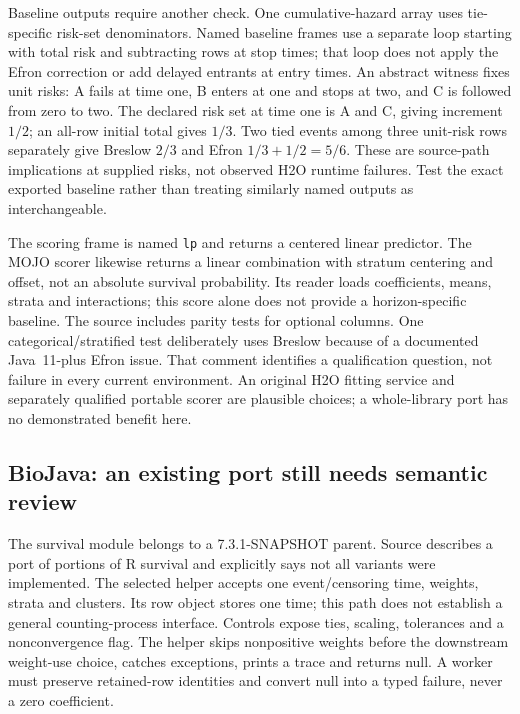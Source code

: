 Baseline outputs require another check. One cumulative-hazard array uses
tie-specific risk-set denominators. Named baseline frames use a separate loop
starting with total risk and subtracting rows at stop times; that loop does
not apply the Efron correction or add delayed entrants at entry times.
An abstract witness fixes unit risks: A fails at time one, B enters at one
and stops at two, and C is followed from zero to two. The declared risk set
at time one is A and C, giving increment $1/2$; an all-row initial total gives
$1/3$. Two tied events among three unit-risk rows separately give Breslow
$2/3$ and Efron $1/3+1/2=5/6$. These are source-path implications at
supplied risks, not observed H2O runtime failures. Test the exact exported
baseline rather than treating similarly named outputs as interchangeable.
\citep{exec24_longjava_h2o,exec24_longjava_reference}

The scoring frame is named \texttt{lp} and returns a centered linear
predictor. The MOJO scorer likewise returns a linear combination with
stratum centering and offset, not an absolute survival probability. Its
reader loads coefficients, means, strata and interactions; this score alone
does not provide a horizon-specific baseline. The source includes parity
tests for optional columns. One categorical/stratified test deliberately uses
Breslow because of a documented Java~11-plus Efron issue. That comment
identifies a qualification question, not failure in every current environment.
An original H2O fitting service and separately qualified portable scorer are
plausible choices; a whole-library port has no demonstrated benefit here.
\citep{exec24_longjava_h2o}

\subsection{BioJava: an existing port still needs semantic review}
The survival module belongs to a 7.3.1-SNAPSHOT parent. Source describes a
port of portions of R survival and explicitly says not all variants were
implemented. The selected helper accepts one event/censoring time, weights,
strata and clusters. Its row object stores one time; this path does not
establish a general counting-process interface. Controls expose ties,
scaling, tolerances and a nonconvergence flag. The helper skips nonpositive
weights before the downstream weight-use choice, catches exceptions, prints
a trace and returns null. A worker must preserve retained-row identities
and convert null into a typed failure, never a zero coefficient.
\citep{exec24_longjava_biojava}

